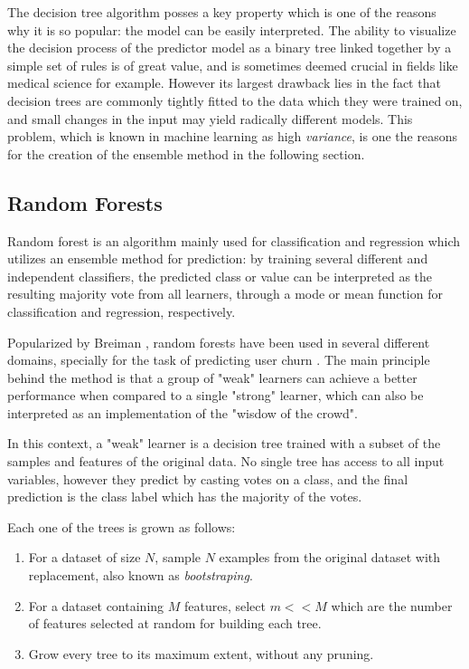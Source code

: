 \documentclass{kththesis}
\begin{document}
The decision tree algorithm posses a key property which is one of the reasons why it is so popular: the model can be easily interpreted. The ability to visualize the decision process of the predictor model as a binary tree linked together by a simple set of rules is of great value, and is sometimes deemed crucial in fields like medical science for example. However its largest drawback lies in the fact that decision trees are commonly tightly fitted to the data which they were trained on, and small changes in the input may yield radically different models. This problem, which is known in machine learning as high \emph{variance}, is one the reasons for the creation of the ensemble method in the following section.
 
\subsection{Random Forests}

Random forest is an algorithm mainly used for classification and regression which utilizes an ensemble method for prediction: by training several different and independent classifiers, the predicted class or value can be interpreted as the resulting majority vote from all learners, through a mode or mean function for classification and regression, respectively.

Popularized by Breiman \citep{breiman2001random}, random forests have been used in several different domains, specially for the task of predicting user churn \citep{coussement2013customer} \citep{burez2008separating}. The main principle behind the method is that a group of "weak" learners can achieve a better performance when compared to a single "strong" learner, which can also be interpreted as an implementation of the "wisdow of the crowd". 

In this context, a "weak" learner is a decision tree trained with a subset of the samples and features of the original data. No single tree has access to all input variables, however they predict by casting votes on a class, and the final prediction is the class label which has the majority of the votes.

Each one of the trees is grown as follows:

\begin{enumerate}
\item For a dataset of size $N$, sample $N$ examples from the original dataset with replacement, also known as \emph{bootstraping}.
\item For a dataset containing $M$ features, select $m<<M$ which are the number of features selected at random for building each tree.
\item Grow every tree to its maximum extent, without any pruning.
\end{enumerate}
\end{document}
